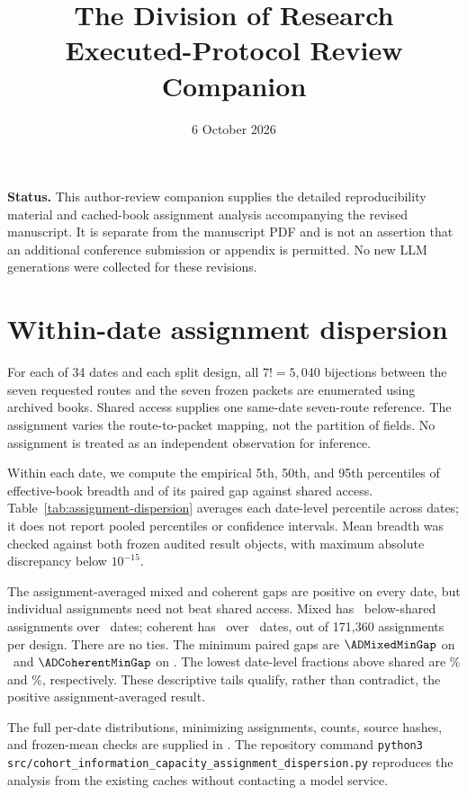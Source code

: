 \documentclass[10pt]{article}
\title{The Division of Research\\Executed-Protocol Review Companion}
\author{}
\date{6 October 2026}
\begin{document}
\maketitle
\noindent\textbf{Status.} This author-review companion supplies the detailed reproducibility material and cached-book assignment analysis accompanying the revised manuscript. It is separate from the manuscript PDF and is not an assertion that an additional conference submission or appendix is permitted. No new LLM generations were collected for these revisions.


\clearpage
\section{Within-date assignment dispersion}
For each of 34 dates and each split design, all $7!=5{,}040$ bijections between the seven requested routes and the seven frozen packets are enumerated using archived books. Shared access supplies one same-date seven-route reference. The assignment varies the route-to-packet mapping, not the partition of fields. No assignment is treated as an independent observation for inference.

Within each date, we compute the empirical 5th, 50th, and 95th percentiles of effective-book breadth and of its paired gap against shared access. Table~\ref{tab:assignment-dispersion} averages each date-level percentile across dates; it does not report pooled percentiles or confidence intervals. Mean breadth was checked against both frozen audited result objects, with maximum absolute discrepancy below $10^{-15}$.

\begin{table}[htbp]
\caption{Descriptive dispersion over route-to-packet assignments.}
\label{tab:assignment-dispersion}
\centering

\end{table}

The assignment-averaged mixed and coherent gaps are positive on every date, but individual assignments need not beat shared access. Mixed has \ADMixedBelowCount\ below-shared assignments over \ADMixedNegativeDates\ dates; coherent has \ADCoherentBelowCount\ over \ADCoherentNegativeDates\ dates, out of 171,360 assignments per design. There are no ties. The minimum paired gaps are $\ADMixedMinGap$ on \ADMixedWorstDate\ and $\ADCoherentMinGap$ on \ADCoherentWorstDate. The lowest date-level fractions above shared are \ADMixedMinAbovePercent\% and \ADCoherentMinAbovePercent\%, respectively. These descriptive tails qualify, rather than contradict, the positive assignment-averaged result.

The full per-date distributions, minimizing assignments, counts, source hashes, and frozen-mean checks are supplied in . The repository command \texttt{python3 src/cohort\_information\_capacity\_assignment\_dispersion.py} reproduces the analysis from the existing caches without contacting a model service.
\end{document}
